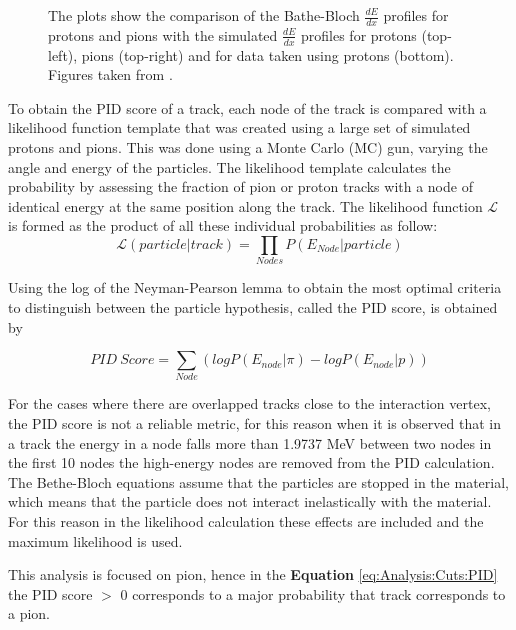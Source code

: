 \begin{itemize}
\begin{figure}[!htb]
        \caption{The plots show the comparison of the Bathe-Bloch $\frac{dE}{dx}$ profiles for protons and pions with the simulated $\frac{dE}{dx}$ profiles for protons (top-left), pions (top-right) and for data taken using protons (bottom). Figures taken from \cite{MINERvA}.}
        \label{fig:Analysis:DataSelection:Cuts:dEdXBetheProfiles}
    \end{figure}

    To obtain the PID score of a track, each node of the track is compared with a likelihood function template that was created using a large set of simulated protons and pions. This was done using a Monte Carlo (MC) gun, varying the angle and energy of the particles. The likelihood template calculates the probability by assessing the fraction of pion or proton tracks with a node of identical energy at the same position along the track. The likelihood function $\mathcal{L}$ is formed as the product of all these individual probabilities as follow:
    \begin{equation}
        \mathcal{L}\left(particle|track\right)=\prod_{Nodes}P\left(E_{Node}|particle\right)
    \end{equation}

    Using the log of the Neyman-Pearson lemma \cite{Neyman-Pearson} to obtain the most optimal criteria to distinguish between the particle hypothesis, called the PID score, is obtained by

    \begin{equation}
        PID\ Score = \sum_{Node} (logP(E_{node}|\pi)-logP(E_{node}|p))
        \label{eq:Analysis:Cuts:PID}
    \end{equation}

    For the cases where there are overlapped tracks close to the interaction vertex, the PID score is not a reliable metric, for this reason when it is observed that in a track the energy in a node falls more than 1.9737 MeV between two nodes in the first 10 nodes the high-energy nodes are removed from the PID calculation. The Bethe-Bloch equations assume that the particles are stopped in the material, which means that the particle does not interact inelastically with the material. For this reason in the likelihood calculation these effects are included and the maximum likelihood is used. 

    This analysis is focused on pion, hence in the \textbf{Equation} \ref{eq:Analysis:Cuts:PID} the PID score $>$ 0 corresponds to a major probability that track corresponds to a pion. 


\end{itemize}
